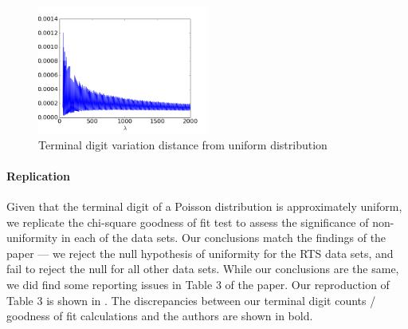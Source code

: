 \documentclass[11pt]{article}
\begin{document}
\begin{figure}[htbp]
    \centering
    \includegraphics[width=0.5\textwidth]{term_variation_dist}
    \caption{Terminal digit variation distance from uniform distribution}
    \label{fig:term_var_dist}
\end{figure}

\paragraph{Replication} Given that the terminal digit of a Poisson distribution is approximately uniform, we replicate the chi-square goodness of fit test to assess the significance of non-uniformity in each of the data sets. Our conclusions match the findings of the paper --- we reject the null hypothesis of uniformity for the RTS data sets, and fail to reject the null for all other data sets. While our conclusions are the same, we did find some reporting issues in Table 3 of the paper. Our reproduction of Table 3 is shown in . The discrepancies between our terminal digit counts / goodness of fit calculations and the authors are shown in bold.
\end{document}
